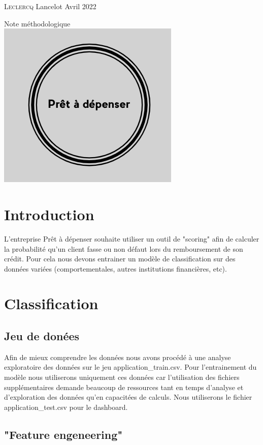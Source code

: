 \documentclass[12pt, a4paper]{article}
\begin{document}
\date{mai 2022}
\begin{titlepage}
    \large{\textsc{Leclercq} Lancelot} \hfill \normalsize{Avril 2022}
    \vfill
    \begin{center}
        \huge{Note méthodologique}\\
        \vfill
        \includegraphics[width=.3\textwidth]{logoPAD.png}\\
    \end{center}
    \vfill
    \renewcommand{\contentsname}{Sommaire}
    \pdfbookmark{\contentsname}{toc}
    \tableofcontents
\end{titlepage}

\section{Introduction}

L'entreprise Prêt à dépenser souhaite utiliser un outil de "scoring" afin de calculer la probabilité qu'un client fasse ou non défaut lors du remboursement de son crédit.
Pour cela nous devons entrainer un modèle de classification sur des données variées (comportementales, autres institutions financières, etc).

\section{Classification}
\subsection{Jeu de donées}

Afin de mieux comprendre les données nous avons procédé à une analyse exploratoire des données sur le jeu application\_train.csv.
Pour l'entrainement du modèle nous utiliserons uniquement ces données car l'utilisation des fichiers supplémentaires demande beaucoup de ressources tant en temps d'analyse et d'exploration des données qu'en capacitées de calculs.
Nous utiliserons le fichier application\_test.csv pour le dashboard.

\subsection{"Feature engeneering"}
\end{document}
